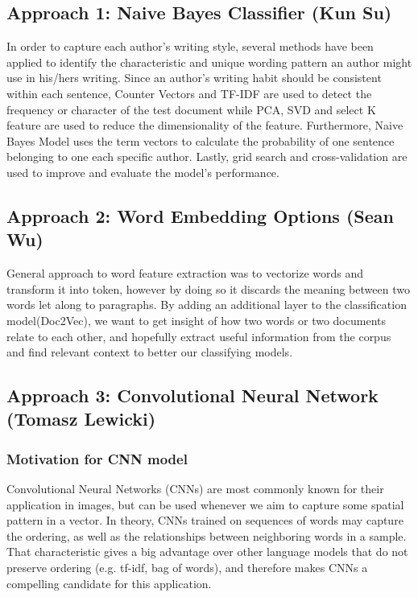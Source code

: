 \documentclass[journal,12pt,onecolumn]{IEEEtran}
\begin{document}
\subsection{Approach 1: Naive Bayes Classifier (Kun Su)}
In order to capture each author’s writing style, several methods have been applied to identify the characteristic and unique wording pattern an author might use in his/hers writing. Since an author’s writing habit should be consistent within each sentence, Counter Vectors and TF-IDF are used to detect the frequency or character of the test document while PCA, SVD and select K feature are used to reduce the dimensionality of the feature. Furthermore, Naive Bayes Model uses the term vectors to calculate the probability of one sentence belonging to one each specific author. Lastly, grid search and cross-validation are used to improve and evaluate the model’s performance.

\subsection{Approach 2: Word Embedding Options (Sean Wu)}
General approach to word feature extraction was to vectorize words and transform it into token, however by doing so it discards the meaning between two words let along to paragraphs. By adding an additional layer to the classification model(Doc2Vec), we want to get insight of how two words or two documents relate to each other, and hopefully extract useful information from the corpus and find relevant context to better our classifying models.


\subsection{Approach 3: Convolutional Neural Network (Tomasz Lewicki)}

\subsubsection{Motivation for CNN model}
Convolutional Neural Networks (CNNs) are most commonly known for their application in images, but can be used whenever we aim to capture some spatial pattern in a vector. In theory, CNNs trained on sequences of words may capture the ordering, as well as the relationships between neighboring words in a sample. That characteristic gives a big advantage over other language models that do not preserve ordering (e.g. tf-idf, bag of words), and therefore makes CNNs a compelling candidate for this application.
\end{document}
